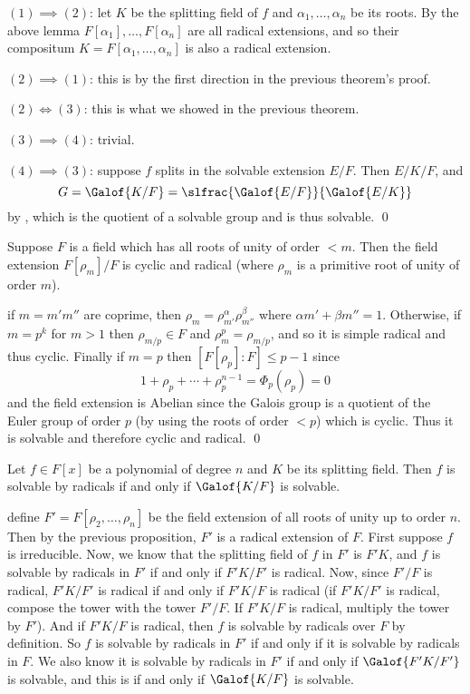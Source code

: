 \ethrm

\Proof $(1)\implies(2)$: let $K$ be the splitting field of $f$ and $\alpha_1,\dots,\alpha_n$ be its roots.
By the above lemma $F[\alpha_1],\dots,F[\alpha_n]$ are all radical extensions, and so their compositum $K=F[\alpha_1,\dots,\alpha_n]$ is also a radical extension.

$(2)\implies(1)$: this is by the first direction in the previous theorem's proof.

$(2)\iff(3)$: this is what we showed in the previous theorem.

$(3)\implies(4)$: trivial.

$(4)\implies(3)$: suppose $f$ splits in the solvable extension $E/F$.
Then $E/K/F$, and
$$ G=\Galof{K/F}=\slfrac{\Galof{E/F}}{\Galof{E/K}} $$
by , which is the quotient of a solvable group and is thus solvable.
\qed

\bprop

    Suppose $F$ is a field which has all roots of unity of order $<m$.
    Then the field extension $F[\rho_m]/F$ is cyclic and radical (where $\rho_m$ is a primitive root of unity of order $m$).

\eprop

\Proof if $m=m'm''$ are coprime, then $\rho_m=\rho_{m'}^\alpha\rho_{m''}^\beta$ where $\alpha m'+\beta m''=1$.
Otherwise, if $m=p^k$ for $m>1$ then $\rho_{m/p}\in F$ and $\rho_m^p=\rho_{m/p}$, and so it is simple radical and thus cyclic.
Finally if $m=p$ then $[F[\rho_p]:F]\leq p-1$ since
$$ 1 + \rho_p + \cdots + \rho_p^{n-1} = \Phi_p(\rho_p) = 0 $$
and the field extension is Abelian since the Galois group is a quotient of the Euler group of order $p$ (by using the roots of order $<p$) which is cyclic.
Thus it is solvable and therefore cyclic and radical.
\qed

\bthrm

    Let $f\in F[x]$ be a polynomial of degree $n$ and $K$ be its splitting field.
    Then $f$ is solvable by radicals if and only if $\Galof{K/F}$ is solvable.

\ethrm

\Proof define $F'=F[\rho_2,\dots,\rho_n]$ be the field extension of all roots of unity up to order $n$.
Then by the previous proposition, $F'$ is a radical extension of $F$.
First suppose $f$ is irreducible.
Now, we know that the splitting field of $f$ in $F'$ is $F'K$, and $f$ is solvable by radicals in $F'$ if and only if $F'K/F'$ is radical.
Now, since $F'/F$ is radical, $F'K/F'$ is radical if and only if $F'K/F$ is radical (if $F'K/F'$ is radical, compose the tower with the tower $F'/F$.
If $F'K/F$ is radical, multiply the tower by $F'$).
And if $F'K/F$ is radical, then $f$ is solvable by radicals over $F$ by definition.
So $f$ is solvable by radicals in $F'$ if and only if it is solvable by radicals in $F$.
We also know it is solvable by radicals in $F'$ if and only if $\Galof{F'K/F'}$ is solvable, and this is if and only if $\Galof{K/F}$ is solvable.

